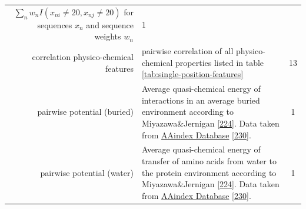 \documentclass[11pt,a4paper,twoside]{book}
\theoremstyle{definition}
\theoremstyle{definition}
\theoremstyle{remark}
\begin{document}
\begin{longtable}[]{@{}rlc@{}}
\begin{minipage}[t]{0.50\columnwidth}
\(\sum_n w_n I(x_{ni} \! \neq \! 20, x_{nj} \! \neq \! 20)\) for
sequences \(x_n\) and sequence weights \(w_n\)\strut
\end{minipage} & \begin{minipage}[t]{0.18\columnwidth}\centering\strut
1\strut
\end{minipage}\tabularnewline
\begin{minipage}[t]{0.23\columnwidth}\raggedleft\strut
correlation physico-chemical features\strut
\end{minipage} & \begin{minipage}[t]{0.50\columnwidth}\raggedright\strut
pairwise correlation of all physico-chemical properties listed in table
\ref{tab:single-position-features}\strut
\end{minipage} & \begin{minipage}[t]{0.18\columnwidth}\centering\strut
13\strut
\end{minipage}\tabularnewline
\begin{minipage}[t]{0.23\columnwidth}\raggedleft\strut
pairwise potential (buried)\strut
\end{minipage} & \begin{minipage}[t]{0.50\columnwidth}\raggedright\strut
Average quasi-chemical energy of interactions in an average buried
environment according to Miyazawa\&Jernigan
{[}\protect\hyperlink{ref-Miyazawa1999a}{224}{]}. Data taken from
\href{http://www.genome.jp/dbget-bin/www_bget?aaindex:MIYS990107}{AAindex
Database} {[}\protect\hyperlink{ref-Kawashima2008}{230}{]}.\strut
\end{minipage} & \begin{minipage}[t]{0.18\columnwidth}\centering\strut
1\strut
\end{minipage}\tabularnewline
\begin{minipage}[t]{0.23\columnwidth}\raggedleft\strut
pairwise potential (water)\strut
\end{minipage} & \begin{minipage}[t]{0.50\columnwidth}\raggedright\strut
Average quasi-chemical energy of transfer of amino acids from water to
the protein environment according to Miyazawa\&Jernigan
{[}\protect\hyperlink{ref-Miyazawa1999a}{224}{]}. Data taken from
\href{http://www.genome.jp/dbget-bin/www_bget?aaindex:MIYS990106}{AAindex
Database} {[}\protect\hyperlink{ref-Kawashima2008}{230}{]}.\strut
\end{minipage} & \begin{minipage}[t]{0.18\columnwidth}\centering\strut
1\strut
\end{minipage}\tabularnewline

\end{longtable}
\end{document}
